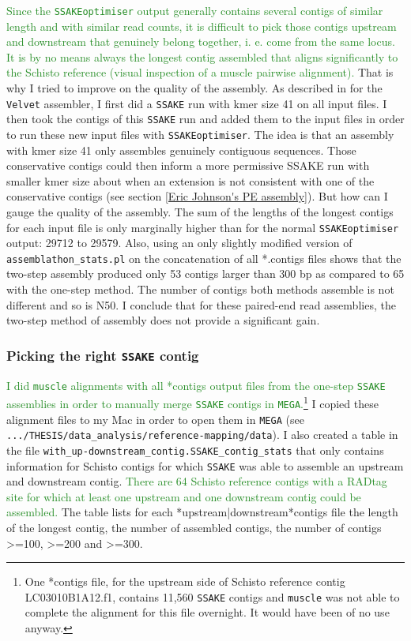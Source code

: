 \documentclass{article}\usepackage[]{graphicx}\usepackage[]{color}
\newcommand{\roger}[1]{ \textcolor[named]{ForestGreen}{#1} }
\begin{document}
\roger{Since the \texttt{SSAKEoptimiser} output generally contains several contigs of similar length and with similar read counts, it is difficult to pick those contigs upstream and downstream that genuinely belong together, i. e. come from the same locus. It is by no means always the longest contig assembled that aligns significantly to the Schisto reference (visual inspection of a muscle pairwise alignment).} That is why I tried to improve on the quality of the assembly. As described in \citet{Etter2011} for the \texttt{Velvet} assembler, I first did a \texttt{SSAKE} run with kmer size 41 on all input files. I then took the contigs of this \texttt{SSAKE} run and added them to the input files in order to run these new input files with \texttt{SSAKEoptimiser}. The idea is that an assembly with kmer size 41 only assembles genuinely contiguous sequences. Those conservative contigs could then inform a more permissive SSAKE run with smaller kmer size about when an extension is not consistent with one of the conservative contigs (see section \ref{Eric Johnson's PE assembly}). But how can I gauge the quality of the assembly. The sum of the lengths of the longest contigs for each input file is only marginally higher than for the normal \texttt{SSAKEoptimiser} output: 29712 to 29579. Also, using an only slightly modified version of \texttt{assemblathon\_stats.pl} on the concatenation of all *.contigs files shows that the two-step assembly produced only 53 contigs larger than 300 bp as compared to 65 with the one-step method. The number of contigs both methods assemble is not different and so is N50. I conclude that for these paired-end read assemblies, the two-step method of assembly does not provide a significant gain.

\subsubsection{Picking the right \texttt{SSAKE} contig}
\label{pick}

\roger{I did \texttt{muscle} alignments with all *contigs output files from the one-step \texttt{SSAKE} assemblies in order to manually merge \texttt{SSAKE} contigs in \texttt{MEGA}.\footnote{One *contigs file, for the upstream side of Schisto reference contig LC03010B1A12.f1, contains 11,560 \texttt{SSAKE} contigs and \texttt{muscle} was not able to complete the alignment for this file overnight. It would have been of no use anyway.} } I copied these alignment files to my Mac in order to open them in \texttt{MEGA} (see \verb!.../THESIS/data_analysis/reference-mapping/data!).
I also created a table in the file \verb!with_up-downstream_contig.SSAKE_contig_stats! that only contains information for Schisto contigs for which \texttt{SSAKE} was able to assemble an upstream and downstream contig. \roger{There are 64 Schisto reference contigs with a RADtag site for which at least one upstream and one downstream contig could be assembled.} The table lists for each *upstream|downstream*contigs file the length of the longest contig, the number of assembled contigs, the number of contigs >=100, >=200 and >=300.
\end{document}
